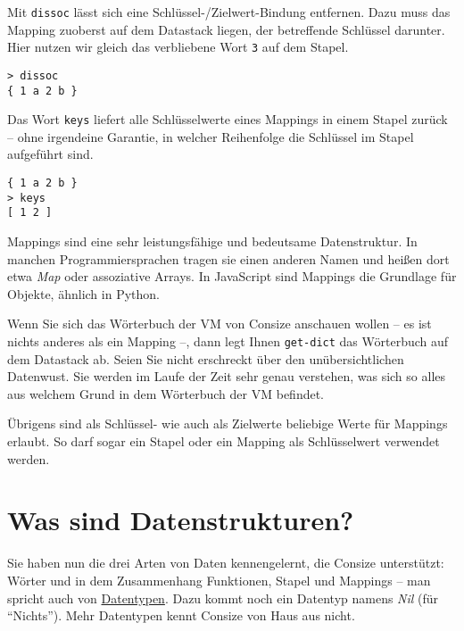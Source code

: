 Mit \verb|dissoc| lässt sich eine Schlüssel-\slash Zielwert-Bindung entfernen. Dazu muss das Mapping zuoberst auf dem Datastack liegen, der betreffende Schlüssel darunter. Hier nutzen wir gleich das verbliebene Wort \verb|3| auf dem Stapel.

\begin{verbatim}
> dissoc
{ 1 a 2 b }
\end{verbatim}

Das Wort \verb|keys| liefert alle Schlüsselwerte eines Mappings in einem Stapel zurück -- ohne irgendeine Garantie, in welcher Reihenfolge die Schlüssel im Stapel aufgeführt sind.

\begin{verbatim}
{ 1 a 2 b }
> keys
[ 1 2 ]
\end{verbatim}

Mappings sind eine sehr leistungsfähige und bedeutsame Datenstruktur. In manchen Programmiersprachen tragen sie einen anderen Namen und heißen dort etwa \emph{Map} oder assoziative Arrays. In JavaScript sind Mappings die Grundlage für Objekte, ähnlich in Python.

Wenn Sie sich das Wörterbuch der VM von Consize anschauen wollen -- es ist nichts anderes als ein Mapping --, dann legt Ihnen \verb|get-dict| das Wörterbuch auf dem Datastack ab. Seien Sie nicht erschreckt über den unübersichtlichen Datenwust. Sie werden im Laufe der Zeit sehr genau verstehen, was sich so alles aus welchem Grund in dem Wörterbuch der VM befindet.

Übrigens sind als Schlüssel- wie auch als Zielwerte beliebige Werte für Mappings erlaubt. So darf sogar ein Stapel oder ein Mapping als Schlüs\-sel\-wert verwendet werden.

\section{Was sind Datenstrukturen?}

Sie haben nun die drei Arten von Daten kennengelernt, die Consize unterstützt: Wörter und in dem Zusammenhang Funktionen, Stapel und Mappings -- man spricht auch von \href{http://de.wikipedia.org/wiki/Datentyp}{Datentypen}. Dazu kommt noch ein Datentyp namens \emph{Nil} (für "`Nichts"'). Mehr Datentypen kennt Consize von Haus aus nicht.

